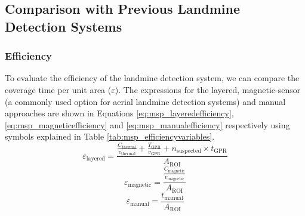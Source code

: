 \subsection{Comparison with Previous Landmine Detection Systems}
\label{sec:msp_comparison_manual_demining}

\subsubsection{Efficiency}

To evaluate the efficiency of the landmine detection system, we can compare the coverage time per unit area ($\varepsilon$). The expressions for the layered, magnetic-sensor (a commonly used option for aerial landmine detection systems) and manual approaches are shown in Equations \ref{eq:msp_layeredefficiency}, \ref{eq:msp_magneticefficiency} and \ref{eq:msp_manualefficiency} respectively using symbols explained in Table \ref{tab:msp_efficiencyvariables}.
\begin{equation}
\label{eq:msp_layeredefficiency}
\varepsilon_{\mathrm{layered}} = \frac{\frac{C_{\mathrm{thermal}}}{v_{\mathrm{thermal}}}+\frac{T_{\mathrm{GPR}}}{v_{\mathrm{GPR}}}+n_{\mathrm{suspected}} \times t_{\mathrm{GPR}}}{A_{\mathrm{ROI}}}
\end{equation}
\begin{equation}
\label{eq:msp_magneticefficiency}
\varepsilon_{\mathrm{magnetic}} = \frac{\frac{C_{\mathrm{magnetic}}}{v_{\mathrm{magnetic}}}}{A_{\mathrm{ROI}}}
\end{equation}
\begin{equation}
\label{eq:msp_manualefficiency}
\varepsilon_{\mathrm{manual}} = \frac{t_{\mathrm{manual}}}{A_{\mathrm{ROI}}}
\end{equation}

